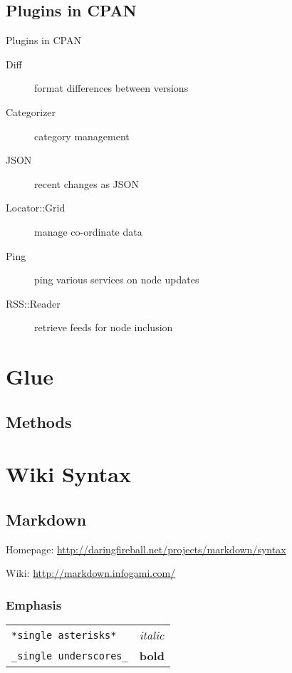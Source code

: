 \subsection{Plugins in CPAN}

\begin{frame}{Plugins in CPAN}
 \begin{description}
  \item[Diff] format differences between versions
  \item[Categorizer] category management
  \item[JSON] recent changes as JSON
  \item[Locator::Grid] manage co-ordinate data
  \item[Ping] ping various services on node updates
  \item[RSS::Reader] retrieve feeds for node inclusion
 \end{description}
\end{frame}

\section{Glue}
\subsection{Methods}


\section{Wiki Syntax}
\subsection{Markdown}
Homepage: \url{http://daringfireball.net/projects/markdown/syntax}

Wiki: \url{http://markdown.infogami.com/}

\subsubsection{Emphasis}

\begin{tabular}{ll}
\verb|*single asterisks*| & \textit{italic} \\
\verb|_single underscores_| & \textbf{bold} \\
\end{tabular}


